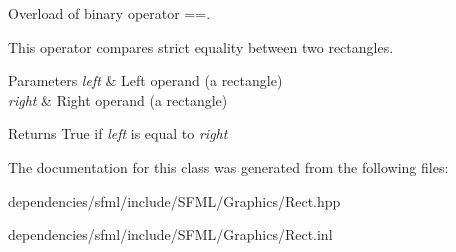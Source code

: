 Overload of binary operator ==. 

This operator compares strict equality between two rectangles.


\begin{DoxyParams}{Parameters}
{\em left} & Left operand (a rectangle) \\
\hline
{\em right} & Right operand (a rectangle)\\
\hline
\end{DoxyParams}
\begin{DoxyReturn}{Returns}
True if {\itshape left} is equal to {\itshape right} 
\end{DoxyReturn}


The documentation for this class was generated from the following files\+:\begin{DoxyCompactItemize}
\item 
dependencies/sfml/include/\+S\+F\+M\+L/\+Graphics/Rect.\+hpp\item 
dependencies/sfml/include/\+S\+F\+M\+L/\+Graphics/Rect.\+inl\end{DoxyCompactItemize}

